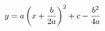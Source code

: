 \documentclass[preview]{standalone}
\begin{document}
\begin{align*}
\special{dvisvgm:raw <g id='unique000'>}y = a\left(x + \frac{b}{2a}\right)^2 + c - \frac{b^2}{4a}\special{dvisvgm:raw </g>}
\end{align*}
\end{document}
